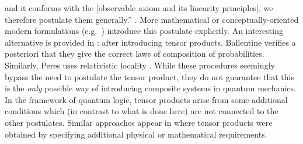 \documentclass[aps,prl,amsmath,amssymb,twocolumn]{revtex4}
\theoremstyle{plain}
\theoremstyle{definition}
\theoremstyle{remark}
\def\comment#1{}
\begin{document}
	and it conforms with the [observable axiom and its linearity
	principles], we therefore postulate them generally.''
	\cite{vonneumannbook}.  More mathematical or conceptually-oriented
	modern formulations (e.g.~\cite{ozawa,masanes,wootters,nielsenchuang})
	introduce this postulate explicitly.  An interesting alternative is
	provided in \cite{ballentinebook,ballentinepaper}: after introducing
	tensor products, Ballentine verifies a posteriori that they give the
	correct laws of composition of probabilities. Similarly, Peres uses
	relativistic locality \cite{peres}. While these procedures seemingly
	bypass the need to postulate the tensor product, they do not guarantee
	that this is the {\em only} possible way of introducing composite
	systems in quantum mechanics. In the framework of quantum logic,
	tensor products arise from some additional conditions \cite{matolcsi}
	which (in contrast to what is done here) are not connected to the
	other postulates. Similar approaches appear in \cite{marmo,aerts}
	where tensor products were obtained by specifying additional physical
	or mathematical requirements. \comment{ {\em Il resto della frase da spostare in supp material} In quantum field theory one tends to
		avoid problems connected with tensor products of infinite dimensional
		spaces by focusing on algebraic commutation structures,
		e.g.~\cite{giddins,roos}.  In particular, the recent MIP*=RE result
		\cite{mipre} implies that, in infinite dimensions, the tensor product
		is strictly less computationally powerful than the commutation
		structures, emphasizing the difference among these two structures, at
		least for the infinite-dimensional case. We will consider the
		non-relativistic setting here.}
	
\end{document}
